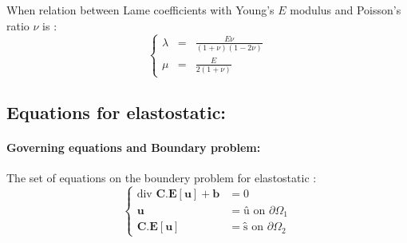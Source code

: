 \documentclass[a4paper,10pt]{article}
\begin{document}
When relation between Lame coefficients with Young's $E$ modulus and Poisson's ratio $\nu$ is :
\[
\left\{ 
\begin{array}{ccc}
      \lambda   &=& \frac{E\nu}{(1+\nu)(1-2\nu)}                           \\ 
           \mu  &=& \frac{E}{2(1+\nu)}           
\end{array}\right.
\]










\subsection{Equations for elastostatic: } 

\paragraph{Governing equations and Boundary problem: }
The set of equations on the boundery problem for elastostatic :
\[
\left\{
\begin{array}{rl}
 \text{div }\textbf{C.E} \left[ \textbf{u} \right] + \textbf{b} & =0 \\
                                       \textbf{u} & = \textbf{\^{u}} \text{         on $\partial\Omega_1 $}\\
           \textbf{C.E} \left[ \textbf{u} \right] &= \textbf{\^{s}}  \text{         on $\partial\Omega_2 $}
\end{array}\right.
\]
\end{document}
